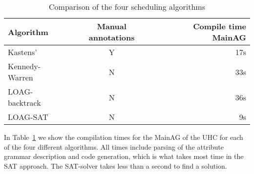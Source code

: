\documentclass{llncs}
\newcommand{\tabref}[1]{Table~\ref{#1}}
\begin{document}
\begin{table}
  \begin{center}
    \begin{tabular}{l || c || r}
      Algorithm   &   Manual annotations   &  Compile time MainAG \\
      \hline
      Kastens'                &   Y           &   17s \\
      Kennedy-Warren  &   N           &   33s \\
      LOAG-backtrack  &   N           &   36s \\
      LOAG-SAT           &   N           &   9s \\
    \end{tabular}
  \end{center}
  \caption{Comparison of the four scheduling algorithms}
  \label{tab:algo-comparison}
\end{table}

In \tabref{tab:algo-comparison} we show the compilation times for the MainAG of the UHC for each of the four different algorithms. All times include parsing of the attribute grammar description and code generation, which is what takes most time in the SAT approach. The SAT-solver takes less than a second to find a solution.
\end{document}
